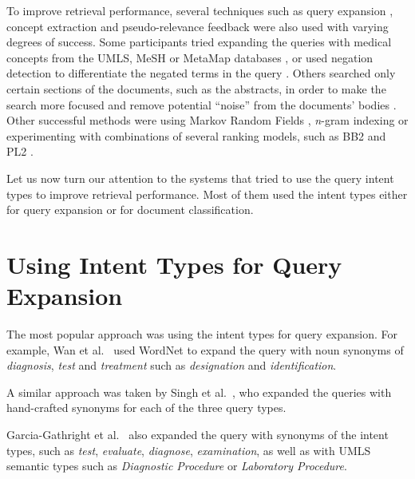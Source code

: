 To improve retrieval performance, several techniques such as
query expansion \cite{mutrec, sankhavara2014fusing, cuhk, CSEIITV, ucla, udel, duth, ir.cs.sfsu, goodwin2014utd, oh2014kisti},
concept extraction \cite{ir.cs.sfsu, ucla, bitem, goodwin2014utd, oh2014kisti}
and pseudo-relevance feedback \cite{novasearch, waterloo, mutrec, oh2014kisti, choi, dinh2014crp}
were also used with varying degrees of success.
Some participants tried expanding the queries with medical concepts
from the UMLS, MeSH or MetaMap databases \cite{lamda2015, ucla, udel, bitem, novasearch},
or used negation detection to differentiate the negated terms in the query
\cite{wing2014query, wei2014atigeo, ucla, oh2014kisti}.
Others searched only certain sections of the documents, such as the abstracts, in order to make the search more focused
and remove potential ``noise'' from the documents' bodies \cite{ucla}.
Other successful methods were using Markov Random Fields \cite{wsuir},
\emph{n}-gram indexing \cite{xu2014hltcoe}
or experimenting with combinations of several ranking models,
such as BB2 and PL2 \cite{song2015ecnu}.

Let us now turn our attention to the systems that tried to use the query intent types to improve retrieval performance.
Most of them used the intent types either for query expansion or for document classification.

\section{Using Intent Types for Query Expansion}

The most popular approach was using the intent types for query expansion.
For example, Wan et al.\ \cite{cuhk} used WordNet to expand the query with noun synonyms
of \emph{diagnosis}, \emph{test} and \emph{treatment} such as \emph{designation} and \emph{identification}.

A similar approach was taken by Singh et al.\ \cite{CSEIITV}, who expanded the queries with hand-crafted synonyms
for each of the three query types.

Garcia-Gathright et al.\ \cite{ucla} also expanded the query with synonyms of the intent types, such as \emph{test}, \emph{evaluate},
\emph{diagnose}, \emph{examination}, as well as with UMLS semantic types such as \emph{Diagnostic Procedure}
or \emph{Laboratory Procedure}.

